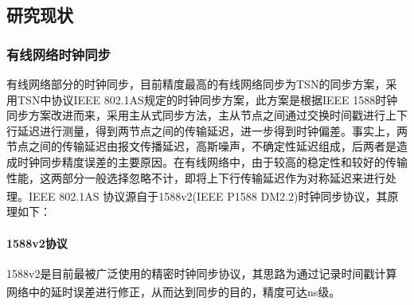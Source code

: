 \documentclass[UTF8,a4paper,12pt]{ctexart}
\numberwithin{equation}{section}
\begin{document}
	\subsection{研究现状}
	\subsubsection{有线网络时钟同步}
	
	有线网络部分的时钟同步，目前精度最高的有线网络同步为TSN的同步方案，采用TSN中协议IEEE 802.1AS规定的时钟同步方案，此方案是根据IEEE 1588时钟同步方案改进而来，采用主从式同步方法，主从节点之间通过交换时间戳进行上下行延迟进行测量，得到两节点之间的传输延迟，进一步得到时钟偏差。事实上，两节点之间的传输延迟由报文传播延迟，高斯噪声，不确定性延迟组成，后两者是造成时钟同步精度误差的主要原因。在有线网络中，由于较高的稳定性和较好的传输性能，这两部分一般选择忽略不计，即将上下行传输延迟作为对称延迟来进行处理\textsuperscript{\cite{teener2008overview}}。IEEE 802.1AS 协议源自于1588v2(IEEE P1588 DM2.2)时钟同步协议，其原理如下：
	\paragraph{1588v2协议}
	1588v2是目前最被广泛使用的精密时钟同步协议，其思路为通过记录时间戳计算网络中的延时误差进行修正，从而达到同步的目的，精度可达ns级\textsuperscript{\cite{huayang2011ieee}}。
	
	\begin{figure}[htb] 
	\end{figure}
	
\end{document}
